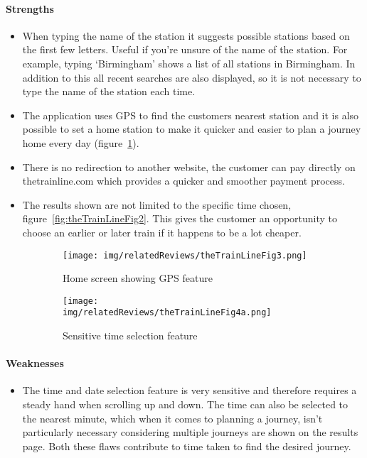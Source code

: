 \paragraph{Strengths}

\begin{itemize}
	\item When typing the name of the station it suggests possible stations
		based on the first few letters. Useful if you're unsure of the name of
		the station. For example, typing `Birmingham' shows a list of all
		stations in Birmingham. In addition to this all recent searches are
		also displayed, so it is not necessary to type the name of the station
		each time.
	\item The application uses GPS to find the customers nearest station and
		it is also possible to set a home station to make it quicker and easier
		to plan a journey home every day (figure~\ref{fig:thetrainline3}).
	\item There is no redirection to another website, the customer can pay
		directly on thetrainline.com which provides a quicker and smoother
		payment process.
	\item The results shown are not limited to the specific time chosen,
		figure~\ref{fig:theTrainLineFig2}. This gives the customer an
		opportunity to choose an earlier or later train if it happens to be a
		lot cheaper.
\end{itemize}
\begin{figure}[htbp]
	\centering
	\begin{subfigure}[b]{0.33\textwidth}
		\texttt{[image: img/relatedReviews/theTrainLineFig3.png]}
		\caption{Home screen showing GPS feature}
	\end{subfigure}%
	\qquad
	\begin{subfigure}[b]{0.33\textwidth}
		\texttt{[image: img/relatedReviews/theTrainLineFig4a.png]}
		\caption{Sensitive time selection feature}
	\end{subfigure}
	\caption{}\label{fig:thetrainline3}
\end{figure}

\paragraph{Weaknesses}
\begin{itemize}
	\item The time and date selection feature is very sensitive and therefore
		requires a steady hand when scrolling up and down. The time can also be
		selected to the nearest minute, which when it comes to planning a
		journey, isn't particularly necessary considering multiple journeys are
		shown on the results page. Both these flaws contribute to time taken to
		find the desired journey.
\end{itemize}

